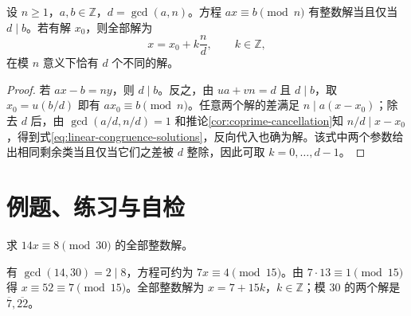 \begin{theorem}[线性同余方程]\label{thm:linear-congruence}
设 $n\geq1$，$a,b\in\mathbb Z$，$d=\gcd(a,n)$。方程 $ax\equiv b\pmod n$ 有整数解当且仅当 $d\mid b$。若有解 $x_0$，则全部解为
\begin{equation}\label{eq:linear-congruence-solutions}
  x=x_0+k\frac nd,\qquad k\in\mathbb Z,
\end{equation}
在模 $n$ 意义下恰有 $d$ 个不同的解。
\end{theorem}
\begin{proof}
若 $ax-b=ny$，则 $d\mid b$。反之，由 $ua+vn=d$ 且 $d\mid b$，取 $x_0=u(b/d)$ 即有 $ax_0\equiv b\pmod n$。任意两个解的差满足 $n\mid a(x-x_0)$；除去 $d$ 后，由 $\gcd(a/d,n/d)=1$ 和推论\ref{cor:coprime-cancellation}知 $n/d\mid x-x_0$，得到式\eqref{eq:linear-congruence-solutions}，反向代入也确为解。该式中两个参数给出相同剩余类当且仅当它们之差被 $d$ 整除，因此可取 $k=0,\ldots,d-1$。
\end{proof}

\section{例题、练习与自检}

\begin{example}[求解线性同余]
求 $14x\equiv8\pmod{30}$ 的全部整数解。
\end{example}
\begin{solve}
有 $\gcd(14,30)=2\mid8$，方程可约为 $7x\equiv4\pmod{15}$。由 $7\cdot13\equiv1\pmod{15}$ 得 $x\equiv52\equiv7\pmod{15}$。全部整数解为 $x=7+15k$，$k\in\mathbb Z$；模 $30$ 的两个解是 $\overline7,\overline{22}$。
\end{solve}

